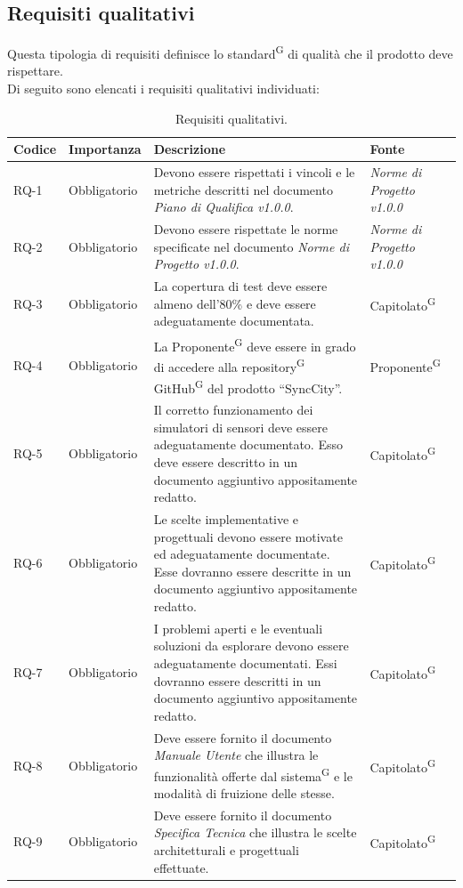 \documentclass[8pt]{article}
\newcommand{\glossterm}[1]{#1\textsuperscript{G}} %
\begin{document}
\subsection{Requisiti qualitativi}
Questa tipologia di requisiti definisce lo \glossterm{standard} di qualità che il prodotto deve rispettare. \\
Di seguito sono elencati i requisiti qualitativi individuati:
\begin{longtable}{|>{\centering\arraybackslash}p{1.2cm}|>{\centering\arraybackslash}p{2cm}|>{\centering\arraybackslash}p{8.5cm}|>{\centering\arraybackslash}p{3cm}|}
    \hline
    \rowcolor{white}
    \textbf{Codice} & \textbf{Importanza} & \textbf{Descrizione} & \textbf{Fonte} \\
    \hline
    \endfirsthead
    \rowcolor{white}
    \caption{Requisiti qualitativi.}
	\label{table:Requisiti qualitativi}
    \endlastfoot
            RQ-1 & Obbligatorio & Devono essere rispettati i vincoli e le metriche descritti nel documento \textit{Piano di Qualifica v1.0.0}. & \textit{Norme di Progetto v1.0.0} \\ \hline
            RQ-2 & Obbligatorio & Devono essere rispettate le norme specificate nel documento \textit{Norme di Progetto v1.0.0}. & \textit{Norme di Progetto v1.0.0} \\ \hline
            RQ-3 & Obbligatorio & La copertura di test deve essere almeno dell'80\% e deve essere adeguatamente documentata. & \glossterm{Capitolato} \\ \hline
            RQ-4 & Obbligatorio & La \glossterm{Proponente} deve essere in grado di accedere alla \glossterm{repository} \glossterm{GitHub} del prodotto ``SyncCity''. & \glossterm{Proponente} \\ \hline
            RQ-5 & Obbligatorio & Il corretto funzionamento dei simulatori di sensori deve essere adeguatamente documentato. Esso deve essere descritto in un documento aggiuntivo appositamente redatto. & \glossterm{Capitolato} \\ \hline
            RQ-6 & Obbligatorio & Le scelte implementative e progettuali devono essere motivate ed adeguatamente documentate. Esse dovranno essere descritte in un documento aggiuntivo appositamente redatto. & \glossterm{Capitolato} \\ \hline
            RQ-7 & Obbligatorio & I problemi aperti e le eventuali soluzioni da esplorare devono essere adeguatamente documentati. Essi dovranno essere descritti in un documento aggiuntivo appositamente redatto. & \glossterm{Capitolato} \\ \hline
            RQ-8 & Obbligatorio & Deve essere fornito il documento \textit{Manuale Utente} che illustra le funzionalità offerte dal \glossterm{sistema} e le modalità di fruizione delle stesse. & \glossterm{Capitolato} \\ \hline
            RQ-9 & Obbligatorio & Deve essere fornito il documento \textit{Specifica Tecnica} che illustra le scelte architetturali e progettuali effettuate. & \glossterm{Capitolato} \\ \hline            
\end{longtable}
\newpage
\end{document}
